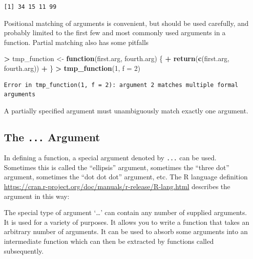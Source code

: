 \documentclass[]{krantz}
\makeatletter
\newenvironment{Shaded}{\begin{snugshade}}{\end{snugshade}}
\newcommand{\KeywordTok}[1]{\textcolor[rgb]{0.27,0.27,0.27}{\textbf{#1}}}
\newcommand{\DataTypeTok}[1]{\textcolor[rgb]{0.27,0.27,0.27}{#1}}
\newcommand{\DecValTok}[1]{\textcolor[rgb]{0.06,0.06,0.06}{#1}}
\newcommand{\StringTok}[1]{\textcolor[rgb]{0.5,0.5,0.5}{#1}}
\newcommand{\ControlFlowTok}[1]{\textcolor[rgb]{0.27,0.27,0.27}{\textbf{#1}}}
\newcommand{\OperatorTok}[1]{\textcolor[rgb]{0.43,0.43,0.43}{\textbf{#1}}}
\newcommand{\NormalTok}[1]{#1}
\renewenvironment{quote}{\begin{VF}}{\end{VF}}
\newenvironment{kframe}{%
\medskip{}
\setlength{\fboxsep}{.8em}
 \def\at@end@of@kframe{}%
 \ifinner\ifhmode%
  \def\at@end@of@kframe{\end{minipage}}%
  \begin{minipage}{\columnwidth}%
 \fi\fi%
 \def\FrameCommand##1{\hskip\@totalleftmargin \hskip-\fboxsep
 \colorbox{shadecolor}{##1}\hskip-\fboxsep
     \hskip-\linewidth \hskip-\@totalleftmargin \hskip\columnwidth}%
 \MakeFramed {\advance\hsize-\width
   \@totalleftmargin\z@ \linewidth\hsize
   \@setminipage}}%
 {\par\unskip\endMakeFramed%
 \at@end@of@kframe}
\renewenvironment{Shaded}{\begin{kframe}}{\end{kframe}}
\theoremstyle{definition}
\theoremstyle{definition}
\theoremstyle{definition}
\theoremstyle{remark}
\makeatother
\begin{document}
\begin{verbatim}
[1] 34 15 11 99
\end{verbatim}

Positional matching of arguments is convenient, but should be used
carefully, and probably limited to the first few and most commonly used
arguments in a function. Partial matching also has some pitfalls

\begin{Shaded}
\begin{Highlighting}[]
\OperatorTok{>}\StringTok{ }\NormalTok{tmp_function <-}\StringTok{ }\ControlFlowTok{function}\NormalTok{(first.arg, fourth.arg) \{}
\OperatorTok{+}\StringTok{   }\KeywordTok{return}\NormalTok{(}\KeywordTok{c}\NormalTok{(first.arg, fourth.arg))}
\OperatorTok{+}\StringTok{ }\NormalTok{\}}
\OperatorTok{>}\StringTok{ }\KeywordTok{tmp_function}\NormalTok{(}\DecValTok{1}\NormalTok{, }\DataTypeTok{f =} \DecValTok{2}\NormalTok{)}
\end{Highlighting}
\end{Shaded}

\begin{verbatim}
Error in tmp_function(1, f = 2): argument 2 matches multiple formal arguments
\end{verbatim}

A partially specified argument must unambiguously match exactly one
argument.

\subsection{\texorpdfstring{The \texttt{...}
Argument}{The ... Argument}}\label{the-...-argument}

In defining a function, a special argument denoted by \texttt{...} can
be used. Sometimes this is called the ``ellipsis'' argument, sometimes
the ``three dot'' argument, sometimes the ``dot dot dot'' argument, etc.
The R language definition
\url{https://cran.r-project.org/doc/manuals/r-release/R-lang.html}
describes the argument in this way:

\begin{quote}
The special type of argument `\ldots{}' can contain any number of
supplied arguments. It is used for a variety of purposes. It allows you
to write a function that takes an arbitrary number of arguments. It can
be used to absorb some arguments into an intermediate function which can
then be extracted by functions called subsequently.
\end{quote}
\end{document}
